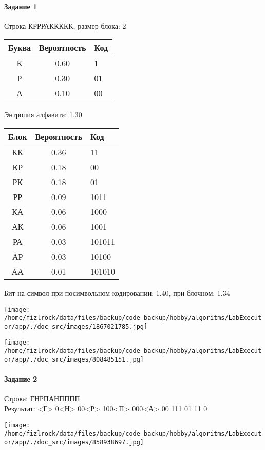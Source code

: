 \documentclass[a4paper, 12pt]{article}
\begin{document}
\paragraph{Задание 1}

Строка КРРРАККККК, размер блока: 2
\begin{center}
 \begin{tabular}{ |c|c|l| } 
  \hline
     Буква & Вероятность & Код\\ \hline
К & 0.60 & 1\\\hline
Р & 0.30 & 01\\\hline
А & 0.10 & 00
\\ \hline \end{tabular}
\end{center}
Энтропия алфавита: 1.30
\begin{center}
 \begin{tabular}{ |c|c|l| } 
  \hline
     Блок & Вероятность & Код\\ \hline
КК & 0.36 & 11\\\hline
КР & 0.18 & 00\\\hline
РК & 0.18 & 01\\\hline
РР & 0.09 & 1011\\\hline
КА & 0.06 & 1000\\\hline
АК & 0.06 & 1001\\\hline
РА & 0.03 & 101011\\\hline
АР & 0.03 & 10100\\\hline
АА & 0.01 & 101010
\\ \hline \end{tabular}
\end{center}
Бит на символ при посимвольном кодировании: 1.40, при блочном: 1.34

\texttt{[image: /home/fizlrock/data/files/backup/code\_backup/hobby/algoritms/LabExecutor/app/./doc\_src/images/1867021785.jpg]}

\texttt{[image: /home/fizlrock/data/files/backup/code\_backup/hobby/algoritms/LabExecutor/app/./doc\_src/images/808485151.jpg]}
\pagebreak
\paragraph{Задание 2}

Строка: 
ГНРПАНПППП\\
Результат: <Г> 0<Н> 00<Р> 100<П> 000<А> 00 111 01 11 0

\texttt{[image: /home/fizlrock/data/files/backup/code\_backup/hobby/algoritms/LabExecutor/app/./doc\_src/images/858938697.jpg]}
\end{document}
